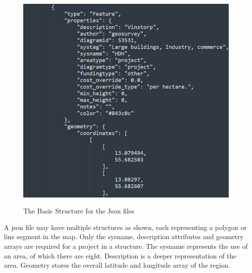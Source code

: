 \begin{figure}[H]
\caption{The Basic Structure for the Json files}
\centering
\includegraphics[scale=0.5]{pic1.png}
\label{fig:label}
\end{figure}
A json file may have multiple structures as shown, each representing a polygon or line segment in the map. Only the sysname, description attributes and geometry arrays are required for a project in a structure. The sysname represents the use of an area, of which there are eight. Description is a deeper representation of the area. Geometry stores the overall latitude and longitude array of the region.




